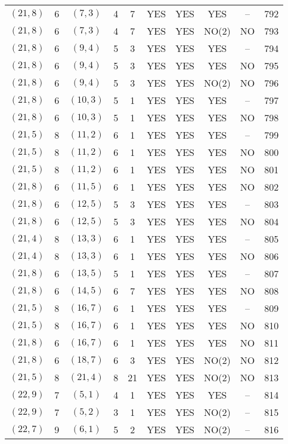 \begin{longtable}{|c|c|c|c|c|c|c|c|c|c|}
$(21, 8)$ & 6 & $(7, 3)$ & 4 & 7 & YES & YES & YES & -- & 792\\
$(21, 8)$ & 6 & $(7, 3)$ & 4 & 7 & YES & YES & NO(2) & NO & 793\\
$(21, 8)$ & 6 & $(9, 4)$ & 5 & 3 & YES & YES & YES & -- & 794\\
$(21, 8)$ & 6 & $(9, 4)$ & 5 & 3 & YES & YES & YES & NO & 795\\
$(21, 8)$ & 6 & $(9, 4)$ & 5 & 3 & YES & YES & NO(2) & NO & 796\\
$(21, 8)$ & 6 & $(10, 3)$ & 5 & 1 & YES & YES & YES & -- & 797\\
$(21, 8)$ & 6 & $(10, 3)$ & 5 & 1 & YES & YES & YES & NO & 798\\
$(21, 5)$ & 8 & $(11, 2)$ & 6 & 1 & YES & YES & YES & -- & 799\\
$(21, 5)$ & 8 & $(11, 2)$ & 6 & 1 & YES & YES & YES & NO & 800\\
$(21, 5)$ & 8 & $(11, 2)$ & 6 & 1 & YES & YES & YES & NO & 801\\
$(21, 8)$ & 6 & $(11, 5)$ & 6 & 1 & YES & YES & YES & NO & 802\\
$(21, 8)$ & 6 & $(12, 5)$ & 5 & 3 & YES & YES & YES & -- & 803\\
$(21, 8)$ & 6 & $(12, 5)$ & 5 & 3 & YES & YES & YES & NO & 804\\
$(21, 4)$ & 8 & $(13, 3)$ & 6 & 1 & YES & YES & YES & -- & 805\\
$(21, 4)$ & 8 & $(13, 3)$ & 6 & 1 & YES & YES & YES & NO & 806\\
$(21, 8)$ & 6 & $(13, 5)$ & 5 & 1 & YES & YES & YES & -- & 807\\
$(21, 8)$ & 6 & $(14, 5)$ & 6 & 7 & YES & YES & YES & NO & 808\\
$(21, 5)$ & 8 & $(16, 7)$ & 6 & 1 & YES & YES & YES & -- & 809\\
$(21, 5)$ & 8 & $(16, 7)$ & 6 & 1 & YES & YES & YES & NO & 810\\
$(21, 8)$ & 6 & $(16, 7)$ & 6 & 1 & YES & YES & YES & NO & 811\\
$(21, 8)$ & 6 & $(18, 7)$ & 6 & 3 & YES & YES & NO(2) & NO & 812\\
$(21, 5)$ & 8 & $(21, 4)$ & 8 & 21 & YES & YES & NO(2) & NO & 813\\
$(22, 9)$ & 7 & $(5, 1)$ & 4 & 1 & YES & YES & YES & -- & 814\\
$(22, 9)$ & 7 & $(5, 2)$ & 3 & 1 & YES & YES & NO(2) & -- & 815\\
$(22, 7)$ & 9 & $(6, 1)$ & 5 & 2 & YES & YES & NO(2) & -- & 816\\

\end{longtable}
